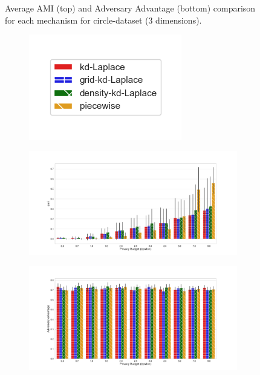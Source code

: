 \begin{figure}[H]
\begin{subfigure}{1\textwidth}
    \end{subfigure}
    \caption{Average AMI (top) and Adversary Advantage (bottom) comparison for each mechanism for circle-dataset (3 dimensions).}
    \label{fig:utility_circle-dataset_comparison_nd_plot}
\end{figure}
\newpage

\begin{figure}[H]
    \centering
    \begin{subfigure}{0.30\textwidth}
        \includegraphics[width=\textwidth]{Results/kd-laplace/ami_bar_comparison_legend.png}
    \end{subfigure}
    \begin{subfigure}{1\textwidth}
        \includegraphics[width=1\textwidth]{Results/kd-laplace/ami_skewed-dataset_comparison.png}
    \end{subfigure}
    \begin{subfigure}{1\textwidth}
        \includegraphics[width=1\textwidth]{Results/kd-laplace/shokri_mi_adv_skewed-dataset_comparison.png}

\end{subfigure}
\end{figure}
